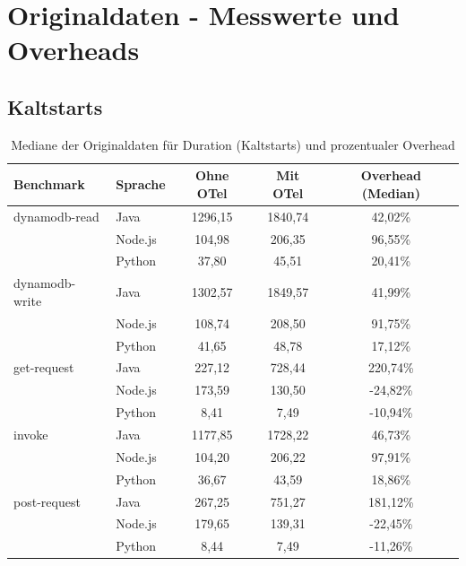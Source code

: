 \section{Originaldaten - Messwerte und Overheads}
\subsection{Kaltstarts}
\label{app:raw:cold}
\begin{table}[H]
\centering
\footnotesize
\caption{Mediane der Originaldaten für Duration (Kaltstarts) und prozentualer Overhead}
\label{app:raw-duration-cold}
\begin{tabular}{|l|l|c|c|c|}
\hline
\textbf{Benchmark} & \textbf{Sprache} & \textbf{Ohne OTel} & \textbf{Mit OTel} & \textbf{Overhead (Median)} \\
\hline
dynamodb-read   & Java    & 1296,15 & 1840,74 & 42,02\% \\
                & Node.js &  104,98 &  206,35 & 96,55\% \\
                & Python  &   37,80 &   45,51 & 20,41\% \\
\hline
dynamodb-write  & Java    & 1302,57 & 1849,57 & 41,99\% \\
                & Node.js &  108,74 &  208,50 & 91,75\% \\
                & Python  &   41,65 &   48,78 & 17,12\% \\
\hline
get-request     & Java    &  227,12 &  728,44 & 220,74\% \\
                & Node.js &  173,59 &  130,50 & -24,82\% \\
                & Python  &    8,41 &    7,49 & -10,94\% \\
\hline
invoke          & Java    & 1177,85 & 1728,22 & 46,73\% \\
                & Node.js &  104,20 &  206,22 & 97,91\% \\
                & Python  &   36,67 &   43,59 & 18,86\% \\
\hline
post-request    & Java    &  267,25 &  751,27 & 181,12\% \\
                & Node.js &  179,65 &  139,31 & -22,45\% \\
                & Python  &    8,44 &    7,49 & -11,26\% \\
\hline
\end{tabular}
\end{table}

